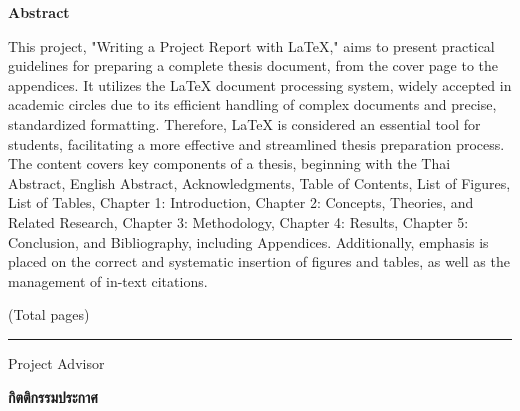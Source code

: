 \vspace{5mm}
\begin{center}\textbf{Abstract}\end{center}

\hspace*{1.5em} %
This project, "Writing a Project Report with LaTeX," aims to present practical guidelines for preparing a complete thesis document, from the cover page to the appendices. It utilizes the LaTeX document processing system, widely accepted in academic circles due to its efficient handling of complex documents and precise, standardized formatting. Therefore, LaTeX is considered an essential tool for students, facilitating a more effective and streamlined thesis preparation process. The content covers key components of a thesis, beginning with the Thai Abstract, English Abstract, Acknowledgments, Table of Contents, List of Figures, List of Tables, Chapter 1: Introduction, Chapter 2: Concepts, Theories, and Related Research, Chapter 3: Methodology, Chapter 4: Results, Chapter 5: Conclusion, and Bibliography, including Appendices. Additionally, emphasis is placed on the correct and systematic insertion of figures and tables, as well as the management of in-text citations.

\begin{flushright}
(Total \pageref{LastPage} pages)

\vfill

\rule{12 cm}{0.4pt} Project Advisor

\end{flushright}


\newpage
{}
{}
\begin{center}\textbf{กิตติกรรมประกาศ}\end{center}

